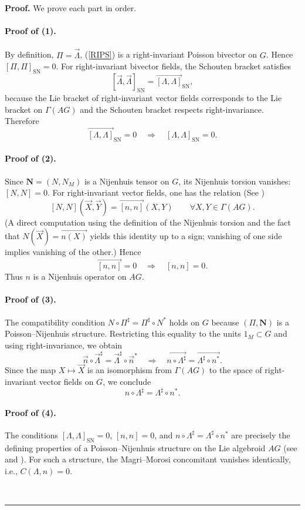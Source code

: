 \documentclass{article}
\newcommand{\SN}{\mathrm{SN}}
\newcommand{\II}{\Pi}
\newcommand{\NN}{\mathbf{N}}
\newcommand{\LL}{\Lambda}
\newenvironment{proof}[1][Proof]{\noindent\textbf{#1.} }{\ \rule{0.5em}{0.5em}}
\begin{document}
\begin{proof}
We prove each part in order.

\paragraph{Proof of (1).}
By definition, $\II = \vec{\LL}$, (\ref{RIPS}) is a right-invariant Poisson bivector on $G$. Hence $[\II, \II]_{\SN} = 0$. For right-invariant bivector fields, the Schouten bracket satisfies
\[
[\vec{\LL}, \vec{\LL}]_{\SN} = \overrightarrow{[\LL, \LL]}_{\SN},
\]
because the Lie bracket of right-invariant vector fields corresponds to the Lie bracket on $\Gamma(AG)$ and the Schouten bracket respects right-invariance. Therefore
\[
\overrightarrow{[\LL, \LL]}_{\SN} = 0 \quad \Longrightarrow \quad [\LL, \LL]_{\SN} = 0.
\]

\paragraph{Proof of (2).}
Since $\NN = (N, N_M)$ is a Nijenhuis tensor on $G$, its Nijenhuis torsion vanishes: $[N, N] = 0$. For right-invariant vector fields, one has the relation (See \cite{Kiril0Mackenzie})
\[
[N, N](\vec{X}, \vec{Y}) = \overrightarrow{[n, n]}(X, Y) \qquad \forall X, Y \in \Gamma(AG).
\]
(A direct computation using the definition of the Nijenhuis torsion and the fact that $N(\vec{X}) = \vec{n(X)}$ yields this identity up to a sign; vanishing of one side implies vanishing of the other.) Hence
\[
\overrightarrow{[n, n]} = 0 \quad \Longrightarrow \quad [n, n] = 0.
\]
Thus $n$ is a Nijenhuis operator on $AG$.

\paragraph{Proof of (3).}
The compatibility condition $N \circ \II^{\sharp} = \II^{\sharp} \circ N^{*}$ holds on $G$ because $(\II, \NN)$ is a Poisson–Nijenhuis structure. Restricting this equality to the units $1_M \subset G$ and using right-invariance, we obtain
\[
\vec{n} \circ \vec{\LL}^{\sharp} = \vec{\LL}^{\sharp} \circ \vec{n}^{*} \quad \Longrightarrow \quad \overrightarrow{n \circ \LL^{\sharp}} = \overrightarrow{\LL^{\sharp} \circ n^{*}}.
\]
Since the map $X \mapsto \vec{X}$ is an isomorphism from $\Gamma(AG)$ to the space of right-invariant vector fields on $G$, we conclude
\[
n \circ \LL^{\sharp} = \LL^{\sharp} \circ n^{*}.
\]

\paragraph{Proof of (4).}
The conditions $[\LL, \LL]_{\SN} = 0$, $[n, n] = 0$, and $n \circ \LL^{\sharp} = \LL^{\sharp} \circ n^{*}$ are precisely the defining properties of a Poisson–Nijenhuis structure on the Lie algebroid $AG$ (see \cite{Kosman2} and \cite{Magri}). For such a structure, the Magri–Morosi concomitant vanishes identically, i.e., $C(\LL, n) = 0$.


\end{proof}
\end{document}
